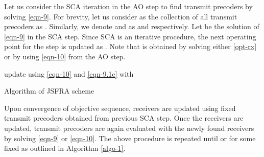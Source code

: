 Let us consider the  \ac{SCA} iteration in the  \ac{AO} step to find transmit precoders by solving \eqref{eqn-9}. For brevity, let us consider  as the collection of all transmit precoders as . Similarly, we denote  and \eqn{\mbfa{\beta}} as  and  respectively. Let  be the solution of \eqref{eqn-9} in the  \ac{SCA} step. Since \ac{SCA} is an iterative procedure, the next operating point  for the  step is updated as . Note that  is obtained by solving either \eqref{opt-rx} or by using \eqref{eqn-10} from the  \ac{AO} step.
\begin{algorithm}
	\SetAlgoLined
	\DontPrintSemicolon
	\BlankLine
	update  using \eqref{eqn-10} and \eqref{eqn-9.1c} with  \;
	\caption{Algorithm of \acs{JSFRA} scheme}
	\label{algo-1} 
\end{algorithm}
	
Upon convergence of objective sequence, receivers are updated using fixed transmit precoders  obtained from previous \ac{SCA} step. Once the receivers are updated, transmit precoders are again evaluated with the newly found receivers by solving \eqref{eqn-9} or \eqref{eqn-10}. The above procedure is repeated until  or for some fixed  as outlined in Algorithm \ref{algo-1}.

